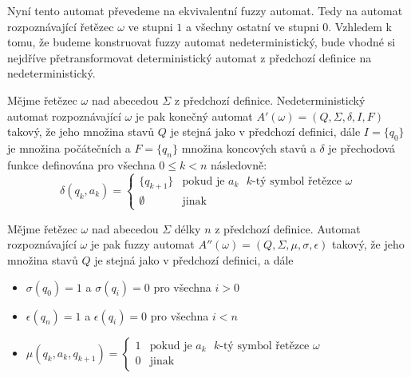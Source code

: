 \documentclass[a4paper,10pt]{article}
\begin{document}
Nyní tento automat převedeme na ekvivalentní fuzzy automat. Tedy na automat rozpoznávající řetězec $\omega$ ve stupni $1$ a všechny ostatní ve stupni $0$. Vzhledem k tomu, že budeme konstruovat fuzzy automat nedeterministický, bude vhodné si nejdříve přetransformovat deterministický automat z předchozí definice na nedeterministický.

\begin{definition} \label{def-AutRozpOme}
  Mějme řetězec $\omega$ nad abecedou $\Sigma$ z předchozí definice. Nedeterministický automat rozpoznávající $\omega$ je pak konečný automat $A'(\omega) = ( Q, \Sigma, \delta, I, F )$ takový, že jeho množina stavů $Q$ je stejná jako v předchozí definici, dále $I = \{ q_0 \}$ je množina počátečních a $F = \{ q_n \}$ množina koncových stavů a $\delta$ je přechodová funkce definována pro všechna $0 \leq k < n$ následovně:
  $$
  \delta(q_{k}, a_k) = 
  \begin{cases}
      \{ q_{k+1} \}	&\text{pokud je $a_k$ $k$-tý symbol řetězce $\omega$} \\
      \emptyset	&\text{jinak}
  \end{cases}
  $$
\end{definition}


\begin{definition} \label{def-FuzzAutRozpOme}
  Mějme řetězec $\omega$ nad abecedou $\Sigma$ délky $n$ z předchozí definice. Automat rozpoznávající $\omega$ je pak fuzzy automat $A''(\omega) = ( Q, \Sigma, \mu, \sigma, \epsilon )$ takový, že jeho množina stavů $Q$ je stejná jako v předchozí definici, a dále
  \begin{itemize}
   \item $\sigma(q_0) = 1$ a $\sigma(q_i) = 0$ pro všechna $i > 0$
   \item $\epsilon(q_n) = 1$ a $\epsilon(q_i) = 0$ pro všechna $i < n$
   \item $\mu(q_{k}, a_k, q_{k+1}) = 
      \begin{cases}
	1		&\text{pokud je $a_k$ $k$-tý symbol řetězce $\omega$} \\
	0		&\text{jinak}
      \end{cases}
      $
  \end{itemize}
\end{definition}
\end{document}
